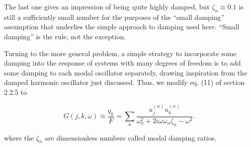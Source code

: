   The last one gives an impression of being quite highly damped, but $\zeta_n 
  \approx 0.1$ is still a sufficiently small number for the purposes of the 
  ``small damping'' assumption that underlies the simple approach to damping 
  used here. ``Small damping'' is the rule, not the exception. 

  Turning to the more general problem, a simple strategy to incorporate some 
  damping into the response of systems with many degrees of freedom is to add 
  some damping to each modal oscillator separately, drawing inspiration from 
  the damped harmonic oscillator just discussed. Thus, we modify eq. (11) of 
  section 2.2.5 to 

  $$G(j,k,\omega) \approx \dfrac{q_k}{F}=\sum_n 
  \dfrac{u_j^{(n)}u_k^{(n)}}{\omega_n^2+2i\omega \omega_n \zeta_n-\omega^2}. 
  \tag{12}$$ 

  where the $\zeta_n$ are dimensionless numbers called modal damping ratios. 
